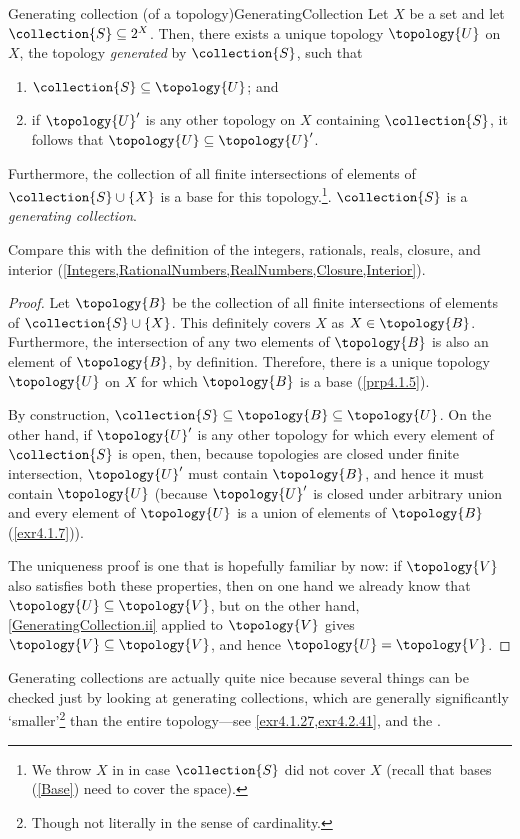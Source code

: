 \begin{prp}{Generating collection (of a top\-ology)}{GeneratingCollection}
Let $X$ be a set and let $\collection{S}\subseteq 2^X$.  Then, there exists a unique topology $\topology{U}$ on $X$, the topology \emph{generated} by $\collection{S}$, such that
\begin{enumerate}
\item \label{GeneratingCollection.i}$\collection{S}\subseteq \topology{U}$; and
\item \label{GeneratingCollection.ii}if $\topology{U}'$ is any other topology on $X$ containing $\collection{S}$, it follows that $\topology{U}\subseteq \topology{U}'$.
\end{enumerate}
Furthermore, the collection of all finite intersections of elements of $\collection{S}\cup \{ X\}$ is a base for this topology.\footnote{We throw $X$ in in case $\collection{S}$ did not cover $X$ (recall that bases (\cref{Base}) need to cover the space).}.  $\collection{S}$ is a \emph{generating collection}.
\begin{rmk}
Compare this with the definition of the integers, rationals, reals, closure, and interior (\cref{Integers,RationalNumbers,RealNumbers,Closure,Interior}).
\end{rmk}
\begin{proof}
Let $\topology{B}$ be the collection of all finite intersections of elements of $\collection{S}\cup \{ X\}$.  This definitely covers $X$ as $X\in \topology{B}$.  Furthermore, the intersection of any two elements of $\topology{B}$ is also an element of $\topology{B}$, by definition.  Therefore, there is a unique topology $\topology{U}$ on $X$ for which $\topology{B}$ is a base (\cref{prp4.1.5}).

By construction, $\collection{S}\subseteq \topology{B}\subseteq \topology{U}$.  On the other hand, if $\topology{U}'$ is any other topology for which every element of $\collection{S}$ is open, then, because topologies are closed under finite intersection, $\topology{U}'$ must contain $\topology{B}$, and hence it must contain $\topology{U}$ (because $\topology{U}'$ is closed under arbitrary union and every element of $\topology{U}$ is a union of elements of $\topology{B}$ (\cref{exr4.1.7})).

The uniqueness proof is one that is hopefully familiar by now:  if $\topology{V}$ also satisfies both these properties, then on one hand we already know that $\topology{U}\subseteq \topology{V}$, but on the other hand, \cref{GeneratingCollection.ii} applied to $\topology{V}$ gives $\topology{V}\subseteq \topology{V}$, and hence $\topology{U}=\topology{V}$.
\end{proof}
\end{prp}
Generating collections are actually quite nice because several things can be checked just by looking at generating collections, which are generally significantly `smaller'\footnote{Though not literally in the sense of cardinality.} than the entire topology---see \cref{exr4.1.27,exr4.2.41}, and the .

